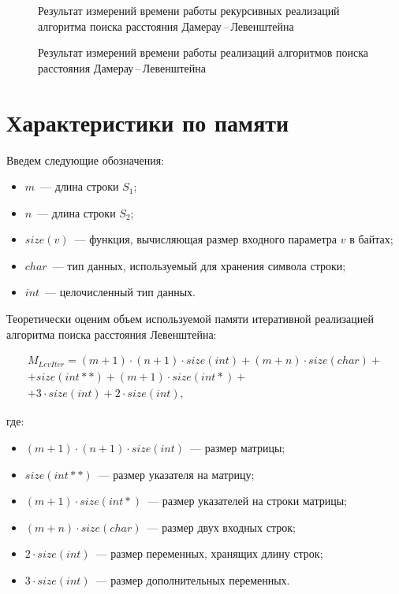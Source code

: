 \begin{figure}[H]
    \centering
    
    \caption{Результат измерений времени работы рекурсивных реализаций алгоритма поиска расстояния Дамерау\,--\,Левенштейна}
    \label{fig:rec-time}
\end{figure}

\begin{figure}[H]
    \centering
    
    \caption{Результат измерений времени работы реализаций алгоритмов поиска расстояния Дамерау\,--\,Левенштейна}
    \label{fig:dl-all-time}
\end{figure}

\section{Характеристики по памяти}

Введем следующие обозначения:

\begin{itemize}
    \item $m$~--- длина строки $S_1$;
    \item $n$~--- длина строки $S_2$;
    \item $size(v)$~--- функция, вычисляющая размер входного параметра $v$ в байтах;
    \item $char$~--- тип данных, используемый для хранения символа строки;
    \item $int$~--- целочисленный тип данных.
\end{itemize}

Теоретически оценим объем используемой памяти итеративной реа\-лизацией алгоритма поиска расстояния Левенштейна:

\begin{multline}
    M_{LevIter} = (m + 1) \cdot (n + 1) \cdot size(int) + (m + n) \cdot size(char) + \\
    + size(int**) + (m + 1) \cdot size(int*) + \\
    + 3 \cdot size(int) + 2 \cdot size(int),
\end{multline}

\noindent где:
\begin{itemize}
    \item $(m + 1) \cdot (n + 1) \cdot size(int)$~--- размер матрицы;
    \item $size(int**)$~--- размер указателя на матрицу;
    \item $(m + 1) \cdot size(int*)$~--- размер указателей на строки матрицы;
    \item $(m + n) \cdot size(char)$~--- размер двух входных строк;
    \item $2 \cdot size(int)$~--- размер переменных, хранящих длину строк;
    \item $3 \cdot size(int)$~--- размер дополнительных переменных.
\end{itemize}

